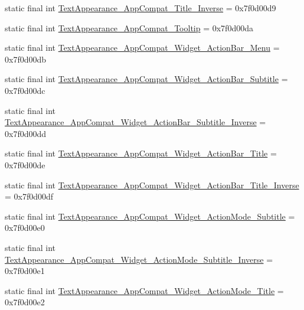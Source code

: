 \begin{DoxyCompactItemize}
\item 
static final int \mbox{\hyperlink{classandroid_1_1support_1_1design_1_1_r_1_1style_a8f9745ee1bf804c7d2e699cc8c9816d7}{Text\+Appearance\+\_\+\+App\+Compat\+\_\+\+Title\+\_\+\+Inverse}} = 0x7f0d00d9
\item 
static final int \mbox{\hyperlink{classandroid_1_1support_1_1design_1_1_r_1_1style_a3854c9afaabc2eb17e3e636d10324e85}{Text\+Appearance\+\_\+\+App\+Compat\+\_\+\+Tooltip}} = 0x7f0d00da
\item 
static final int \mbox{\hyperlink{classandroid_1_1support_1_1design_1_1_r_1_1style_a86a5d5ff68181041becf5bb70064877c}{Text\+Appearance\+\_\+\+App\+Compat\+\_\+\+Widget\+\_\+\+Action\+Bar\+\_\+\+Menu}} = 0x7f0d00db
\item 
static final int \mbox{\hyperlink{classandroid_1_1support_1_1design_1_1_r_1_1style_a3a033a71413fc909da5a3688e40ae1d5}{Text\+Appearance\+\_\+\+App\+Compat\+\_\+\+Widget\+\_\+\+Action\+Bar\+\_\+\+Subtitle}} = 0x7f0d00dc
\item 
static final int \mbox{\hyperlink{classandroid_1_1support_1_1design_1_1_r_1_1style_aa4ba43c3f0e2503bca1b293e5f7fa921}{Text\+Appearance\+\_\+\+App\+Compat\+\_\+\+Widget\+\_\+\+Action\+Bar\+\_\+\+Subtitle\+\_\+\+Inverse}} = 0x7f0d00dd
\item 
static final int \mbox{\hyperlink{classandroid_1_1support_1_1design_1_1_r_1_1style_aaaab7e3d3971a6f10bb562b456a880ce}{Text\+Appearance\+\_\+\+App\+Compat\+\_\+\+Widget\+\_\+\+Action\+Bar\+\_\+\+Title}} = 0x7f0d00de
\item 
static final int \mbox{\hyperlink{classandroid_1_1support_1_1design_1_1_r_1_1style_a2722bf365f89efd965c2db9d167ded91}{Text\+Appearance\+\_\+\+App\+Compat\+\_\+\+Widget\+\_\+\+Action\+Bar\+\_\+\+Title\+\_\+\+Inverse}} = 0x7f0d00df
\item 
static final int \mbox{\hyperlink{classandroid_1_1support_1_1design_1_1_r_1_1style_a88f869ee4fba3220eafc9e864ca53331}{Text\+Appearance\+\_\+\+App\+Compat\+\_\+\+Widget\+\_\+\+Action\+Mode\+\_\+\+Subtitle}} = 0x7f0d00e0
\item 
static final int \mbox{\hyperlink{classandroid_1_1support_1_1design_1_1_r_1_1style_a327b34a8b3d0970314966a1afc1fbad0}{Text\+Appearance\+\_\+\+App\+Compat\+\_\+\+Widget\+\_\+\+Action\+Mode\+\_\+\+Subtitle\+\_\+\+Inverse}} = 0x7f0d00e1
\item 
static final int \mbox{\hyperlink{classandroid_1_1support_1_1design_1_1_r_1_1style_a76c4a04f6f0f71fecc0e75b34c0aa6a0}{Text\+Appearance\+\_\+\+App\+Compat\+\_\+\+Widget\+\_\+\+Action\+Mode\+\_\+\+Title}} = 0x7f0d00e2

\end{DoxyCompactItemize}
